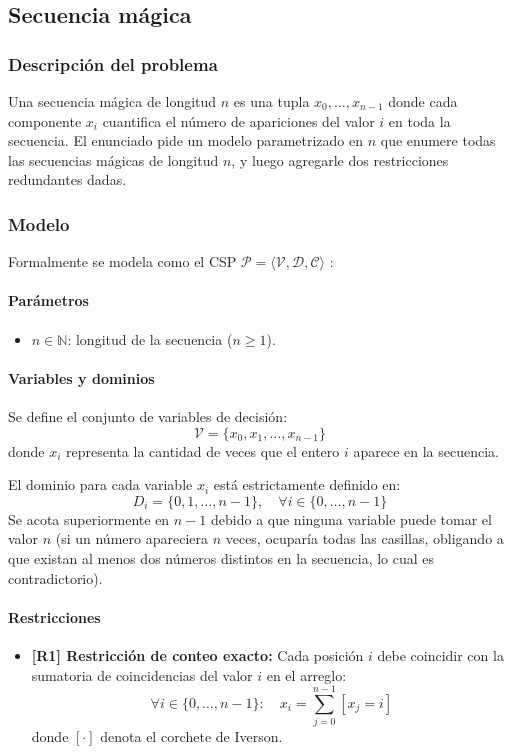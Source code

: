 \subsection{Secuencia mágica}
\label{sec:secuencia}

\subsubsection{Descripción del problema}

Una secuencia mágica de longitud $n$ es una tupla $x_0, \dots, x_{n-1}$ donde cada componente $x_i$ cuantifica el número de apariciones del valor $i$ en toda la secuencia. El enunciado pide un modelo parametrizado en $n$ que enumere todas las secuencias mágicas de longitud $n$, y luego agregarle dos restricciones redundantes dadas.

\subsubsection{Modelo}
Formalmente se modela como el CSP $\mathcal{P} = \langle \mathcal{V}, \mathcal{D}, \mathcal{C} \rangle$ \parencite{apt2003principles}:

\paragraph{Parámetros}
\begin{itemize}
    \item $n \in \mathbb{N}$: longitud de la secuencia ($n \ge 1$).
\end{itemize}

\paragraph{Variables y dominios}
Se define el conjunto de variables de decisión:
\[
\mathcal{V} = \{x_0, x_1, \dots, x_{n-1}\}
\]
donde $x_i$ representa la cantidad de veces que el entero $i$ aparece en la secuencia.

El dominio para cada variable $x_i$ está estrictamente definido en:
\[
D_i = \{0, 1, \dots, n-1\}, \quad \forall i \in \{0, \dots, n-1\}
\]
Se acota superiormente en $n-1$ debido a que ninguna variable puede tomar el valor $n$ (si un número apareciera $n$ veces, ocuparía todas las casillas, obligando a que existan al menos dos números distintos en la secuencia, lo cual es contradictorio).

\paragraph{Restricciones}
\begin{itemize}
    \item \textbf{[R1] Restricción de conteo exacto:} Cada posición $i$ debe coincidir con la sumatoria de coincidencias del valor $i$ en el arreglo:
    \[
    \forall i \in \{0, \dots, n-1\}: \quad x_i = \sum_{j=0}^{n-1} [x_j = i]
    \]
    donde $[\cdot]$ denota el corchete de Iverson.
\end{itemize}

